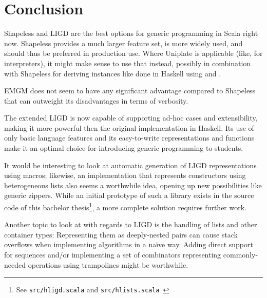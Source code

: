 \chapter{Conclusion}
Shapeless and LIGD are the best options for generic programming in Scala
right now. Shapeless provides a much larger feature set, is more
widely used, and should thus be preferred in production use. Where Uniplate
is applicable (like, for interpreters), it might make sense to use that
instead, possibly in combination with Shapeless for deriving instances like
done in Haskell using  and .

EMGM does not seem to have any significant advantage compared to Shapeless that
can outweight its disadvantages in terms of verbosity.

The extended LIGD is now capable of supporting ad-hoc cases and extensibility,
making it more powerful then the original implementation in Haskell. Its use
of only basic language features and its easy-to-write representations and
functions make it an optimal choice for introducing generic programming to
students.

It would be interesting to look at automatic generation of LIGD representations
using macros; likewise, an implementation that represents constructors using
heterogeneous lists also seems a worthwhile idea, opening up new possibilities
like generic zippers. While an initial prototype of such a library exists in
the source code of this bachelor thesis\footnote{See \texttt{src/hligd.scala} and
\texttt{src/hlists.scala}~\cite{src}}, a more complete solution requires further
work.

Another topic to look at with regards to LIGD is the handling of lists and
other container types: Representing them as deeply-nested pairs can cause
stack overflows when implementing algorithms in a naïve way. Adding direct
support for sequences and/or implementing a set of combinators representing
commonly-needed operations using trampolines might be worthwhile.
